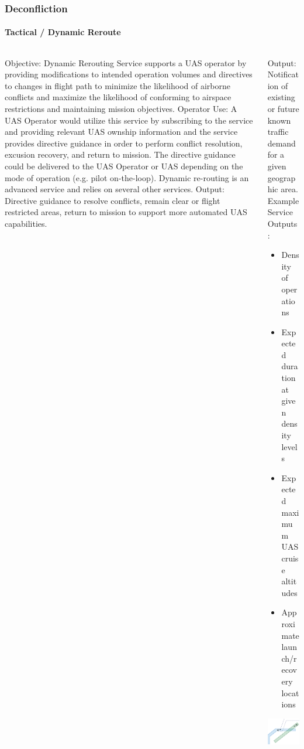 \documentclass[usenames,dvipsnames,aspectratio=169,serif]{beamer}
\begin{document}
\begin{frame}
   \frametitle{Deconfliction}
   \framesubtitle{Tactical / Dynamic Reroute}
   \begin{columns}[t]
      \begin{column}{0.5\textwidth}
         Objective: Dynamic Rerouting Service supports a UAS operator by providing modifications to intended operation volumes and directives to changes in flight path to minimize the likelihood of airborne conflicts and maximize the likelihood of conforming to airspace restrictions and maintaining mission objectives.
         Operator Use: A UAS Operator would utilize this service by subscribing to the service and providing relevant UAS ownship information and the service provides directive guidance in order to perform conflict resolution, excusion recovery, and return to mission. The directive guidance could be delivered to the UAS Operator or UAS depending on the mode of operation (e.g. pilot on-the-loop). Dynamic re-routing is an advanced service and relies on several other services.
         Output: Directive guidance to resolve conflicts, remain clear or flight restricted areas, return to mission to support more automated UAS capabilities.
      \end{column}
      \begin{column}{0.5\textwidth}
         Output: Notification of existing or future known traffic demand for a given geographic area.
         Example Service Outputs:
         \begin{itemize}
         \item  Density of operations
         \item  Expected duration at given density levels
         \item  Expected maximum UAS cruise altitudes
         \item  Approximate launch/recovery locations
         \end{itemize}
         \includegraphics[height=0.45\textwidth]{img/dynamic-rerouting.png}

      \end{column}
   \end{columns}
\end{frame}
\end{document}
